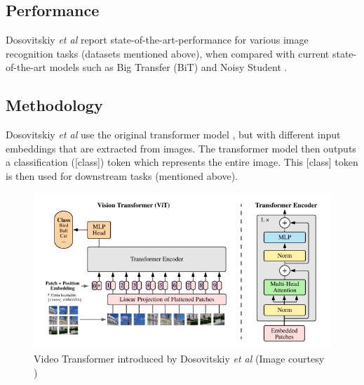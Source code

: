\subsection{Performance}
\par Dosovitskiy \textit{et al} report state-of-the-art-performance for various image recognition tasks (datasets mentioned above), when compared with current state-of-the-art models such as Big Transfer (BiT) \cite{bit} and Noisy Student \cite{nos}.\par


\subsection{Methodology}

\par Dosovitskiy \textit{et al} use the original transformer model \cite{tfm}, but with different input embeddings that are extracted from images. The transformer model then outputs a classification ([class]) token which represents the entire image. This [class] token is then used for downstream tasks (mentioned above).\par

\begin{figure}[h]
	\includegraphics[width=\linewidth]{assets/img/vit.png}
	\caption{Video Transformer introduced by Dosovitskiy \textit{et al} (Image courtesy \cite{vit})}
\end{figure}



